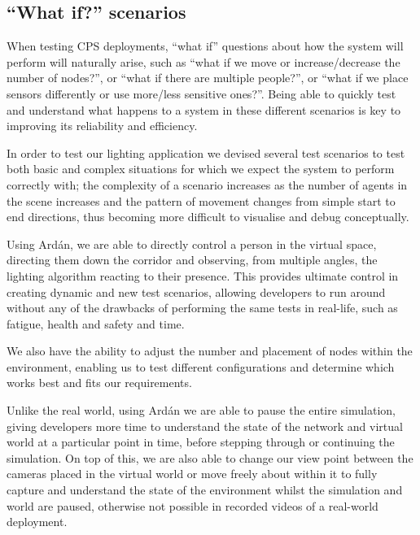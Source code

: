 \subsection{``What if?'' scenarios}
\label{sub:Creating test scenarios}
When testing CPS deployments, ``what if'' questions about how the system will perform will naturally arise, such as ``what if we move or increase/decrease the number of nodes?'', or ``what if there are multiple people?'', or ``what if we place sensors differently or use more/less sensitive ones?''. Being able to quickly test and understand what happens to a system in these different scenarios is key to improving its reliability and efficiency.

In order to test our lighting application we devised several test scenarios to test both basic and complex situations for which we expect the system to perform correctly with; the complexity of a scenario increases as the number of agents in the scene increases and the pattern of movement changes from simple start to end directions, thus becoming more difficult to visualise and debug conceptually.

Using Ard\'{a}n, we are able to directly control a person in the virtual space, directing them down the corridor and observing, from multiple angles, the lighting algorithm reacting to their presence. This provides ultimate control in creating dynamic and new test scenarios, allowing developers to run around without any of the drawbacks of performing the same tests in real-life, such as fatigue, health and safety and time.

We also have the ability to adjust the number and placement of nodes within the environment, enabling us to test different configurations and determine which works best and fits our requirements.

Unlike the real world, using Ard\'{a}n we are able to pause the entire simulation, giving developers more time to understand the state of the network and virtual world at a particular point in time, before stepping through or continuing the simulation. On top of this, we are also able to change our view point between the cameras placed in the virtual world or move freely about within it to fully capture and understand the state of the environment whilst the simulation and world are paused, otherwise not possible in recorded videos of a real-world deployment.

